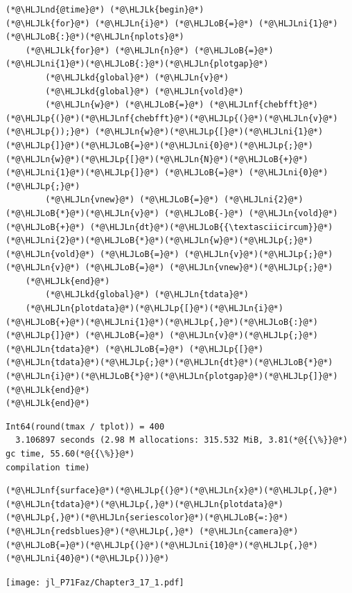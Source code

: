 \documentclass[12pt,a4paper]{article}
\newcommand{\HLJLk}[1]{\textcolor[RGB]{148,91,176}{\textbf{#1}}}
\newcommand{\HLJLkd}[1]{\textcolor[RGB]{214,102,97}{\textit{#1}}}
\newcommand{\HLJLn}[1]{#1}
\newcommand{\HLJLnd}[1]{\textcolor[RGB]{214,102,97}{#1}}
\newcommand{\HLJLnf}[1]{\textcolor[RGB]{66,102,213}{#1}}
\newcommand{\HLJLni}[1]{\textcolor[RGB]{59,151,46}{#1}}
\newcommand{\HLJLoB}[1]{\textcolor[RGB]{102,102,102}{\textbf{#1}}}
\newcommand{\HLJLp}[1]{#1}
\begin{document}
\begin{lstlisting}
(*@\HLJLnd{@time}@*) (*@\HLJLk{begin}@*)
(*@\HLJLk{for}@*) (*@\HLJLn{i}@*) (*@\HLJLoB{=}@*) (*@\HLJLni{1}@*)(*@\HLJLoB{:}@*)(*@\HLJLn{nplots}@*)
    (*@\HLJLk{for}@*) (*@\HLJLn{n}@*) (*@\HLJLoB{=}@*) (*@\HLJLni{1}@*)(*@\HLJLoB{:}@*)(*@\HLJLn{plotgap}@*)
        (*@\HLJLkd{global}@*) (*@\HLJLn{v}@*)
        (*@\HLJLkd{global}@*) (*@\HLJLn{vold}@*)
        (*@\HLJLn{w}@*) (*@\HLJLoB{=}@*) (*@\HLJLnf{chebfft}@*)(*@\HLJLp{(}@*)(*@\HLJLnf{chebfft}@*)(*@\HLJLp{(}@*)(*@\HLJLn{v}@*)(*@\HLJLp{));}@*) (*@\HLJLn{w}@*)(*@\HLJLp{[}@*)(*@\HLJLni{1}@*)(*@\HLJLp{]}@*)(*@\HLJLoB{=}@*)(*@\HLJLni{0}@*)(*@\HLJLp{;}@*) (*@\HLJLn{w}@*)(*@\HLJLp{[}@*)(*@\HLJLn{N}@*)(*@\HLJLoB{+}@*)(*@\HLJLni{1}@*)(*@\HLJLp{]}@*) (*@\HLJLoB{=}@*) (*@\HLJLni{0}@*)(*@\HLJLp{;}@*)
        (*@\HLJLn{vnew}@*) (*@\HLJLoB{=}@*) (*@\HLJLni{2}@*)(*@\HLJLoB{*}@*)(*@\HLJLn{v}@*) (*@\HLJLoB{-}@*) (*@\HLJLn{vold}@*) (*@\HLJLoB{+}@*) (*@\HLJLn{dt}@*)(*@\HLJLoB{{\textasciicircum}}@*)(*@\HLJLni{2}@*)(*@\HLJLoB{*}@*)(*@\HLJLn{w}@*)(*@\HLJLp{;}@*) (*@\HLJLn{vold}@*) (*@\HLJLoB{=}@*) (*@\HLJLn{v}@*)(*@\HLJLp{;}@*) (*@\HLJLn{v}@*) (*@\HLJLoB{=}@*) (*@\HLJLn{vnew}@*)(*@\HLJLp{;}@*)
    (*@\HLJLk{end}@*)
        (*@\HLJLkd{global}@*) (*@\HLJLn{tdata}@*)
    (*@\HLJLn{plotdata}@*)(*@\HLJLp{[}@*)(*@\HLJLn{i}@*)(*@\HLJLoB{+}@*)(*@\HLJLni{1}@*)(*@\HLJLp{,}@*)(*@\HLJLoB{:}@*)(*@\HLJLp{]}@*) (*@\HLJLoB{=}@*) (*@\HLJLn{v}@*)(*@\HLJLp{;}@*) (*@\HLJLn{tdata}@*) (*@\HLJLoB{=}@*) (*@\HLJLp{[}@*)(*@\HLJLn{tdata}@*)(*@\HLJLp{;}@*)(*@\HLJLn{dt}@*)(*@\HLJLoB{*}@*)(*@\HLJLn{i}@*)(*@\HLJLoB{*}@*)(*@\HLJLn{plotgap}@*)(*@\HLJLp{]}@*)
(*@\HLJLk{end}@*)
(*@\HLJLk{end}@*)
\end{lstlisting}

\begin{lstlisting}
Int64(round(tmax / tplot)) = 400
  3.106897 seconds (2.98 M allocations: 315.532 MiB, 3.81(*@{{\%}}@*) gc time, 55.60(*@{{\%}}@*) 
compilation time)
\end{lstlisting}


\begin{lstlisting}
(*@\HLJLnf{surface}@*)(*@\HLJLp{(}@*)(*@\HLJLn{x}@*)(*@\HLJLp{,}@*)(*@\HLJLn{tdata}@*)(*@\HLJLp{,}@*)(*@\HLJLn{plotdata}@*)(*@\HLJLp{,}@*)(*@\HLJLn{seriescolor}@*)(*@\HLJLoB{=:}@*)(*@\HLJLn{redsblues}@*)(*@\HLJLp{,}@*) (*@\HLJLn{camera}@*)(*@\HLJLoB{=}@*)(*@\HLJLp{(}@*)(*@\HLJLni{10}@*)(*@\HLJLp{,}@*)(*@\HLJLni{40}@*)(*@\HLJLp{))}@*)
\end{lstlisting}

\texttt{[image: jl\_P71Faz/Chapter3\_17\_1.pdf]}
\end{document}
